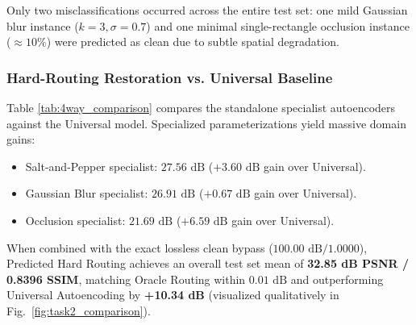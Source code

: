 \documentclass[conference]{IEEEtran}
\begin{document}
\begin{table}[!t]
\centering
\caption{Task 2 Normalized Confusion Matrix ($N=3,669$).}
\label{tab:confusion_matrix}
\end{table}

Only two misclassifications occurred across the entire test set: one mild Gaussian blur instance ($k=3, \sigma=0.7$) and one minimal single-rectangle occlusion instance ($\approx 10\%$) were predicted as clean due to subtle spatial degradation.

\subsubsection{Hard-Routing Restoration vs. Universal Baseline}
Table \ref{tab:4way_comparison} compares the standalone specialist autoencoders against the Universal model. Specialized parameterizations yield massive domain gains:
\begin{itemize}
    \item Salt-and-Pepper specialist: $27.56\text{ dB}$ ($+3.60\text{ dB}$ gain over Universal).
    \item Gaussian Blur specialist: $26.91\text{ dB}$ ($+0.67\text{ dB}$ gain over Universal).
    \item Occlusion specialist: $21.69\text{ dB}$ ($+6.59\text{ dB}$ gain over Universal).
\end{itemize}
When combined with the exact lossless clean bypass ($100.00\text{ dB} / 1.0000$), Predicted Hard Routing achieves an overall test set mean of \textbf{32.85 dB PSNR / 0.8396 SSIM}, matching Oracle Routing within $0.01\text{ dB}$ and outperforming Universal Autoencoding by \textbf{+10.34 dB} (visualized qualitatively in Fig.~\ref{fig:task2_comparison}).
\end{document}
